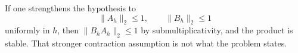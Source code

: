 \begin{solution}
If one strengthens the hypothesis to
\[
\|A_h\|_2\leq 1,\qquad \|B_h\|_2\leq 1
\]
uniformly in $h$, then $\|B_hA_h\|_2\leq 1$ by submultiplicativity, and the product
is stable. That stronger contraction assumption is not what the problem states.
\end{solution}
